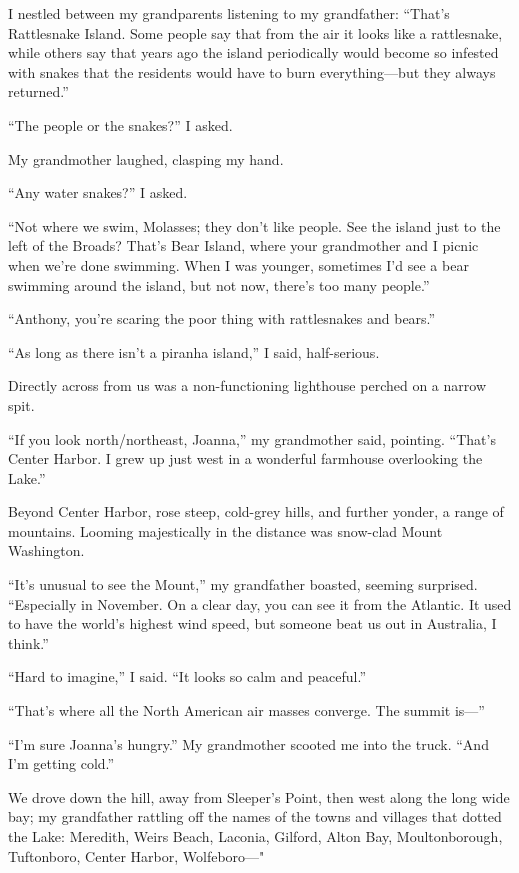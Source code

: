 I nestled between my grandparents listening to my grandfather: ``That's
Rattlesnake Island. Some people say that from the air it looks like a
rattlesnake, while others say that years ago the island periodically
would become so infested with snakes that the residents would have to
burn everything---but they always returned.''

``The people or the snakes?'' I asked.

My grandmother laughed, clasping my hand.

``Any water snakes?'' I asked.

``Not where we swim, Molasses; they don't like people. See the island
just to the left of the Broads? That's Bear Island, where your
grandmother and I picnic when we're done swimming. When I was younger,
sometimes I'd see a bear swimming around the island, but not now,
there's too many people.''

``Anthony, you're scaring the poor thing with rattlesnakes and bears.''

``As long as there isn't a piranha island,'' I said, half-serious.

Directly across from us was a non-functioning lighthouse perched on a
narrow spit.

``If you look north/northeast, Joanna,'' my grandmother said, pointing.
``That's Center Harbor. I grew up just west in a wonderful farmhouse
overlooking the Lake.''

Beyond Center Harbor, rose steep, cold-grey hills, and further yonder, a
range of mountains. Looming majestically in the distance was snow-clad
Mount Washington.

``It's unusual to see the Mount,'' my grandfather boasted, seeming
surprised. ``Especially in November. On a clear day, you can see it from
the Atlantic. It used to have the world's highest wind speed, but
someone beat us out in Australia, I think.''

``Hard to imagine,'' I said. ``It looks so calm and peaceful.''

``That's where all the North American air masses converge. The summit
is---''

``I'm sure Joanna's hungry.'' My grandmother scooted me into the truck.
``And I'm getting cold.''

We drove down the hill, away from Sleeper's Point, then west along the
long wide bay; my grandfather rattling off the names of the towns and
villages that dotted the Lake: Mere\-dith, Weirs Beach, Laconia, Gilford,
Alton Bay, Moultonborough, Tuftonboro, Center Harbor, Wolfeboro---"

